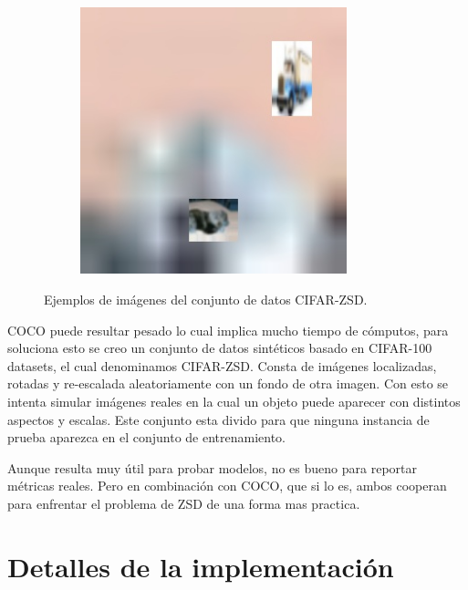 \begin{figure}[H]
\begin{center}
	\begin{subfigure}{.3\textwidth}
		\includegraphics[width=0.85\textwidth]{img/cifar-zsd-test283.jpg}
		\label{fig:ex3}
	\end{subfigure}
	\caption{Ejemplos de imágenes del conjunto de datos CIFAR-ZSD.}
	\label{fig:CIFAR-ZSD}
	\end{center}
\end{figure}

COCO puede resultar pesado lo cual implica mucho tiempo de cómputos, para soluciona esto se creo un conjunto de datos sintéticos basado en CIFAR-100 datasets, el cual denominamos CIFAR-ZSD. Consta de imágenes localizadas, rotadas y re-escalada aleatoriamente con un fondo de otra imagen. Con esto se intenta simular imágenes reales en la cual un objeto puede aparecer con distintos aspectos y escalas. Este conjunto esta divido para que ninguna instancia de prueba  aparezca en el conjunto de entrenamiento.

Aunque resulta muy útil para probar modelos, no es bueno para reportar métricas reales. Pero en combinación con COCO, que si lo es, ambos cooperan para enfrentar el problema de ZSD de una forma mas practica.

\section{Detalles de la implementación}

